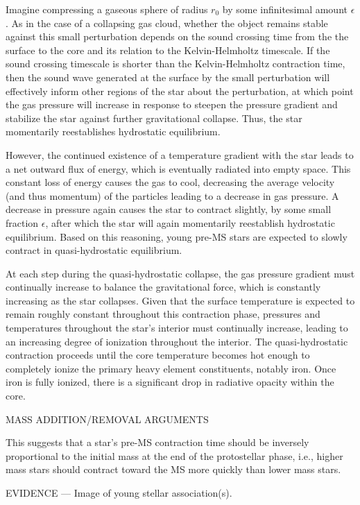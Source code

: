 Imagine compressing a gaseous sphere of radius $r_0$ by some infinitesimal amount $\epsilon$. As in the case of a collapsing gas cloud, whether the object remains stable against this small perturbation depends on the sound crossing time from the the surface to the core and its relation to the Kelvin-Helmholtz timescale. If the sound crossing timescale is shorter than the Kelvin-Helmholtz contraction time, then the sound wave generated at the surface by the small perturbation will effectively inform other regions of the star about the perturbation, at which point the gas pressure will increase in response to steepen the pressure gradient and stabilize the star against further gravitational collapse. Thus, the star momentarily reestablishes hydrostatic equilibrium. 

However, the continued existence of a temperature gradient with the star leads to a net outward flux of energy, which is eventually radiated into empty space. This constant loss of energy causes the gas to cool, decreasing the average velocity (and thus momentum) of the particles leading to a decrease in gas pressure. A decrease in pressure again causes the star to contract slightly, by some small fraction $\epsilon$, after which the star will again momentarily reestablish hydrostatic equilibrium. Based on this reasoning, young pre-MS stars are expected to slowly contract in quasi-hydrostatic equilibrium.

At each step during the quasi-hydrostatic collapse, the gas pressure gradient must continually increase to balance the gravitational force, which is constantly increasing as the star collapses. Given that the surface temperature is expected to remain roughly constant throughout this contraction phase, pressures and temperatures throughout the star's interior must continually increase, leading to an increasing degree of ionization throughout the interior. The quasi-hydrostatic contraction proceeds until the core temperature becomes hot enough to completely ionize the primary heavy element constituents, notably iron. Once iron is fully ionized, there is a significant drop in radiative opacity within the core. 

MASS ADDITION/REMOVAL ARGUMENTS

This suggests that a star's pre-MS contraction time should be inversely proportional to the initial mass at the end of the protostellar phase, i.e., higher mass stars should contract toward the MS more quickly than lower mass stars. 

EVIDENCE --- Image of young stellar association(s).

